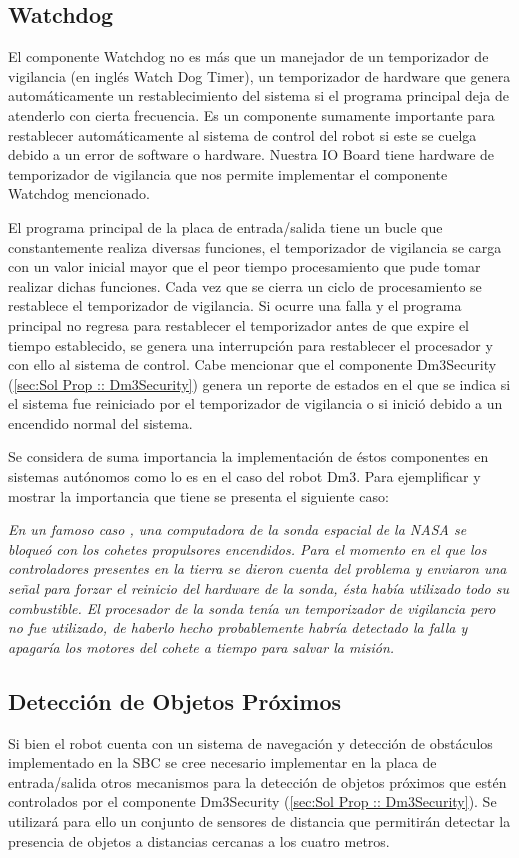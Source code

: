 \documentclass[withindex,glossary]{cam-thesis}
\begin{document}
\subsection{Watchdog} \label{sec: Sol Prop :: Watchdog}
El componente Watchdog no es más que un manejador de un temporizador de vigilancia (en inglés Watch Dog Timer), un temporizador de hardware que genera automáticamente un restablecimiento del sistema si el programa principal deja de atenderlo con cierta frecuencia. Es un componente sumamente importante para  restablecer automáticamente al sistema de control del robot si este se cuelga debido a un error de software o hardware. Nuestra IO Board tiene hardware de temporizador de vigilancia que nos permite implementar el componente Watchdog mencionado.

El programa principal de la placa de entrada/salida tiene un bucle que constantemente realiza diversas funciones, el temporizador de vigilancia se carga con un valor inicial mayor que el peor tiempo procesamiento que pude tomar realizar dichas funciones. Cada vez que se cierra un ciclo de procesamiento se restablece el temporizador de vigilancia. Si ocurre una falla y el programa principal no regresa para restablecer el temporizador antes de que expire el tiempo establecido, se genera una interrupción para restablecer el procesador y con ello al sistema de control.
Cabe mencionar que el componente Dm3Security (\ref{sec:Sol Prop :: Dm3Security}) genera un reporte de estados en el que se indica si el sistema fue reiniciado por el temporizador de vigilancia o si inició debido a un encendido normal del sistema.

Se considera de suma importancia la implementación de éstos componentes en sistemas autónomos como lo es en el caso del robot Dm3. Para ejemplificar y mostrar la importancia que tiene se presenta el siguiente caso:

\textit{En un famoso caso \cite{Clementine}, una computadora de la sonda espacial de la NASA se bloqueó con los cohetes propulsores encendidos. Para el momento en el que los controladores presentes en la tierra se dieron cuenta del problema y enviaron una señal para forzar el reinicio del hardware de la sonda, ésta había utilizado todo su combustible. El procesador de la sonda tenía un temporizador de vigilancia pero no fue utilizado, de haberlo hecho probablemente habría detectado la falla y apagaría los motores del cohete a tiempo para salvar la misión.}

\subsection{Detección de Objetos Próximos} \label{sec:Sol Prop :: detección de objetos próximos}
Si bien el robot cuenta con un sistema de navegación y detección de obstáculos implementado en la \gls{SBC} se cree necesario implementar en la placa de entrada/salida otros mecanismos para la detección de objetos próximos que estén controlados por el componente Dm3Security (\ref{sec:Sol Prop :: Dm3Security}). Se utilizará para ello un conjunto de sensores de distancia que permitirán detectar la presencia de objetos a distancias cercanas a los cuatro metros. 
\end{document}
